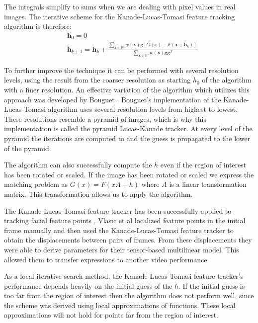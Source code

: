 \documentclass[11pt,a4paper,twoside]{report}
\begin{document}
The integrals simplify to sums when we are dealing with pixel values in real images.
The iterative scheme for the Kanade-Lucas-Tomasi feature tracking algorithm is therefore:
\begin{align}
& \mathbf{h}_0 = 0\\
& \mathbf{h}_{k+1} = \mathbf{h}_k + \frac{\sum_{ \mathbf{x} \in \mathcal{W}} w(\mathbf{x}) \mathbf{g}[G(x) - F(\mathbf{x} + \mathbf{h}_k)]}{\sum_{ \mathbf{x} \in \mathcal{W}} w(\mathbf{x}) \mathbf{g}\mathbf{g}^T}
\end{align}

To further improve the technique it can be performed with several resolution levels, using the result from the coarser resolution as starting
$h_0$ of the algorithm with a finer resolution. An effective variation of the
algorithm which utilizes this approach was developed by Bouguet
\cite{kanade4}. Bouguet's implementation of the Kanade-Lucas-Tomasi algorithm
uses several resolution levels from highest to lowest. These resolutions
resemble a pyramid of images, which is why this implementation is called the
pyramid Lucas-Kanade tracker. At every level of the pyramid the iterations are
computed to and the guess is propagated to the lower of the pyramid.

The algorithm can also successfully compute the $h$ even if the region of interest has been rotated or
scaled. If the image has been rotated or scaled we express the matching problem
as $G(x) = F(xA +h)$ where $A$ is a linear transformation matrix. This
transformation allows us
to apply the algorithm.

The Kanade-Lucas-Tomasi feature tracker has been successfully applied to
tracking facial feature points \cite{faceTransfer05}. Vlasic et al localized
feature points in the initial frame manually and then used the
Kanade-Lucas-Tomasi feature tracker to obtain the displacements between pairs of
frames. From these displacements they were able to derive parameters for their
tensor-based multilinear model. This allowed them to transfer expressions to
another video performance.

As a local iterative search method, the Kanade-Lucas-Tomasi feature tracker's
performance depends heavily on the initial guess of the $h$. If the initial
guess is too far from the region of interest then the algorithm does not perform
well, since the scheme was derived using local approximations of
functions. These local approximations will not hold for points far from the
region of interest.
\end{document}

